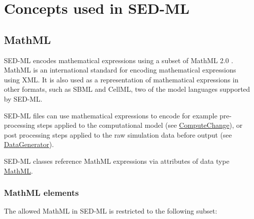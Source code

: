 \pagebreak
\section{Concepts used in SED-ML}
\subsection{MathML}
\label{sec:mathML}
SED-ML encodes mathematical expressions using a subset of MathML 2.0 \citep{CIM+01}. MathML is an international standard for encoding mathematical expressions using XML. It is also used as a representation of mathematical expressions in other formats, such as SBML and CellML, two of the model languages supported by SED-ML. 

SED-ML files can use mathematical expressions to encode for example pre-processing steps applied to the computational model (see \hyperref[class:computeChange]{ComputeChange}), or post processing steps applied to the raw simulation data before output (see \hyperref[class:dataGenerator]{DataGenerator}). 

SED-ML classes reference MathML expressions via attributes of data type \hyperref[type:mathml]{MathML}.

\subsubsection{MathML elements}
The allowed MathML in SED-ML is restricted to the following subset: 

